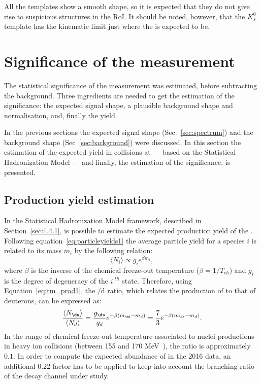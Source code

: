 All the templates show a smooth shape, so it is expected that they do not give rise to suspicious
structures in the RoI. 
It should be noted, however, that the $K_{s}^{0}$ template has the kinematic limit just where the
 \ds is expected to be.

%
%
\section{Significance of the measurement} \label{sec:significance}

The statistical significance of the measurement was estimated, before subtracting the background.
Three ingredients are needed to get the estimation of the significance: the expected signal shape, 
a plausible background shape and normalisation, and, finally  the \ds yield.

In the previous sections the expected signal shape (Sec.~\ref{sec:spectrum}) and the background shape
(Sec~\ref{sec:background}) were discussed. 
In this section the estimation of the expected \ds yield in \pPb collisions at \sctev \ -- based on the
Statistical Hadronization Model -- \ and finally, the estimation of the significance, is presented.

%
\subsection{Production yield estimation} \label{sec:ds_production}

In the Statistical Hadronization Model framework, described in Section~\ref{sec:1.4.1}, is possible 
to estimate the expected production yield of the \ds. Following equation~\eqref{eq:particleyields1}
the average particle yield for a species $i$ is related to its mass $m_{i}$ by the 
following relation:
\begin{equation} \label{eq:tm_prod1}
    \langle N_{i} \rangle \propto g_{i} e^{\beta m_{i}},
\end{equation}
where $\beta$ is the inverse of the chemical freeze-out temperature ($\beta = 1/T_{ch}$) and 
$g_{i}\ $ is the degree of degeneracy of the $i\ ^{th}$ state. 
Therefore, using Equation~\eqref{eq:tm_prod1}, the \ds/d ratio, which relates the production of \ds to that of deuterons, can be expressed as:
\begin{equation} \label{eq:tm_prod2}
\frac{\langle N_{\ds} \rangle}{\langle N_d \rangle}=\frac{g_{\ds}}{g_d}e^{-\beta (m_{\ds} - m_d)}=\frac{7}{3}e^{-\beta (m_{\ds} - m_d)}.
\end{equation}
In the range of chemical freeze-out temperature associated to nuclei productions in
heavy ion collisions (between 155 and 170 MeV~\cite{nucleprod}), the ratio is approximately $0.1$.
In order to compute the expected abundance of \ds in the 2016 \pPb data, an additional 
$0.22$ factor has to be applied to keep into account the branching ratio of the \dstdecay
decay channel under study.

